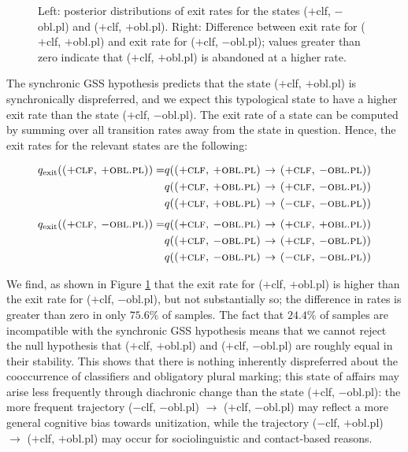 \documentclass[11pt]{article}
\begin{document}
\begin{figure}[h!]
\begin{minipage}[t]{.45\linewidth}
\end{minipage}
\caption{Left: posterior distributions of exit rates for the states {\sc ($+$clf, $-$obl.pl)} and {\sc ($+$clf, $+$obl.pl)}. Right: Difference between exit rate for {\sc ($+$clf, $+$obl.pl)} and exit rate for {\sc ($+$clf, $-$obl.pl)}; values greater than zero indicate that {\sc ($+$clf, $+$obl.pl)} is abandoned at a higher rate.} 
\label{syn_rates}
\end{figure}

The synchronic GSS hypothesis predicts that the state {\sc ($+$clf, $+$obl.pl)} is synchronically dispreferred, and we expect this typological state to have a higher exit rate than the state {\sc ($+$clf, $-$obl.pl)}. 
The exit rate of a state can be computed by summing over all transition rates away from the state in question. Hence, the exit rates for the relevant states are the following:

\begin{align*}
q_{\text{exit}}(\text{{\sc ($+$clf, $+$obl.pl)}}) = & q(\text{\sc ($+$clf, $+$obl.pl) $\rightarrow$ ($+$clf, $-$obl.pl)})\\
& q(\text{\sc ($+$clf, $+$obl.pl) $\rightarrow$ ($+$clf, $-$obl.pl)})\\
& q(\text{\sc ($+$clf, $+$obl.pl) $\rightarrow$ ($-$clf, $-$obl.pl)})\\
\end{align*}
\begin{align*}
q_{\text{exit}}(\text{{\sc ($+$clf, $-$obl.pl)}}) = & q(\text{\sc ($+$clf, $-$obl.pl) $\rightarrow$ ($+$clf, $+$obl.pl)})\\
& q(\text{\sc ($+$clf, $-$obl.pl) $\rightarrow$ ($+$clf, $-$obl.pl)})\\
& q(\text{\sc ($+$clf, $-$obl.pl) $\rightarrow$ ($-$clf, $-$obl.pl)})\\
\end{align*}

We find, as shown in Figure \ref{syn_rates} that the exit rate for {\sc ($+$clf, $+$obl.pl)} is higher than the exit rate for {\sc ($+$clf, $-$obl.pl)}, but not substantially so; the difference in rates is greater than zero in only $75.6\%$ of samples. 
The fact that $24.4\%$ of samples are incompatible with the synchronic GSS hypothesis means that we cannot reject the null hypothesis that {\sc ($+$clf, $+$obl.pl)} and {\sc ($+$clf, $-$obl.pl)} are roughly equal in their stability. This shows that there is nothing inherently dispreferred about the cooccurrence of classifiers and obligatory plural marking; this state of affairs may arise less frequently through diachronic change than the state {\sc ($+$clf, $-$obl.pl)}: the more frequent trajectory {\sc ($-$clf, $-$obl.pl) $\rightarrow$ ($+$clf, $-$obl.pl)} may reflect a more general cognitive bias towards unitization, while the trajectory {\sc ($-$clf, $+$obl.pl) $\rightarrow$ ($+$clf, $+$obl.pl)} may occur for sociolinguistic and contact-based reasons.
\end{document}
